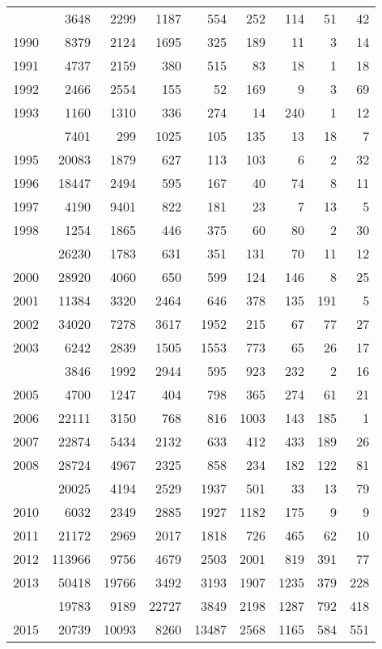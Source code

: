\documentclass[
]{article}
\begin{document}
\begin{longtable}[t]{lrrrrrrrr}
\endfoot
\bottomrule
\endlastfoot
1989 & 3648 & 2299 & 1187 & 554 & 252 & 114 & 51 & 42\\
1990 & 8379 & 2124 & 1695 & 325 & 189 & 11 & 3 & 14\\
1991 & 4737 & 2159 & 380 & 515 & 83 & 18 & 1 & 18\\
1992 & 2466 & 2554 & 155 & 52 & 169 & 9 & 3 & 69\\
1993 & 1160 & 1310 & 336 & 274 & 14 & 240 & 1 & 12\\
\addlinespace
1994 & 7401 & 299 & 1025 & 105 & 135 & 13 & 18 & 7\\
1995 & 20083 & 1879 & 627 & 113 & 103 & 6 & 2 & 32\\
1996 & 18447 & 2494 & 595 & 167 & 40 & 74 & 8 & 11\\
1997 & 4190 & 9401 & 822 & 181 & 23 & 7 & 13 & 5\\
1998 & 1254 & 1865 & 446 & 375 & 60 & 80 & 2 & 30\\
\addlinespace
1999 & 26230 & 1783 & 631 & 351 & 131 & 70 & 11 & 12\\
2000 & 28920 & 4060 & 650 & 599 & 124 & 146 & 8 & 25\\
2001 & 11384 & 3320 & 2464 & 646 & 378 & 135 & 191 & 5\\
2002 & 34020 & 7278 & 3617 & 1952 & 215 & 67 & 77 & 27\\
2003 & 6242 & 2839 & 1505 & 1553 & 773 & 65 & 26 & 17\\
\addlinespace
2004 & 3846 & 1992 & 2944 & 595 & 923 & 232 & 2 & 16\\
2005 & 4700 & 1247 & 404 & 798 & 365 & 274 & 61 & 21\\
2006 & 22111 & 3150 & 768 & 816 & 1003 & 143 & 185 & 1\\
2007 & 22874 & 5434 & 2132 & 633 & 412 & 433 & 189 & 26\\
2008 & 28724 & 4967 & 2325 & 858 & 234 & 182 & 122 & 81\\
\addlinespace
2009 & 20025 & 4194 & 2529 & 1937 & 501 & 33 & 13 & 79\\
2010 & 6032 & 2349 & 2885 & 1927 & 1182 & 175 & 9 & 9\\
2011 & 21172 & 2969 & 2017 & 1818 & 726 & 465 & 62 & 10\\
2012 & 113966 & 9756 & 4679 & 2503 & 2001 & 819 & 391 & 77\\
2013 & 50418 & 19766 & 3492 & 3193 & 1907 & 1235 & 379 & 228\\
\addlinespace
2014 & 19783 & 9189 & 22727 & 3849 & 2198 & 1287 & 792 & 418\\
2015 & 20739 & 10093 & 8260 & 13487 & 2568 & 1165 & 584 & 551\\

\end{longtable}
\end{document}

